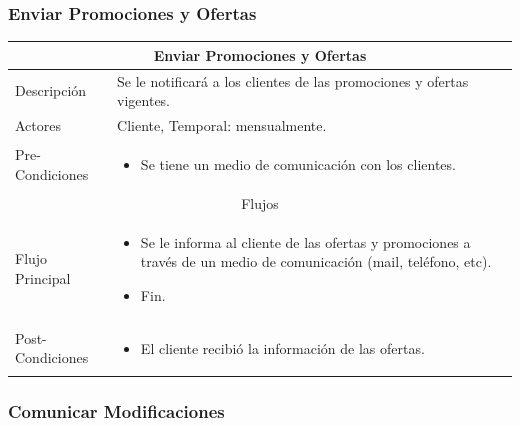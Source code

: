 \documentclass[12pt,a4paper]{article}
\newenvironment{myitemize}
{\begin{itemize}[leftmargin=*,noitemsep,topsep=0pt]}{\end{itemize}}
\newenvironment{caseuse}
{\begin{center}\begin{tabular}{|l|p{10cm}|}}{\end{tabular}\end{center}}
\begin{document}
		\subsubsection{Enviar Promociones y Ofertas}

			\begin{caseuse}
				\hline
				\multicolumn{2}{|c|}{Enviar Promociones y Ofertas} \\ \hline

				Descripción & Se le notificará a los clientes de las promociones y ofertas vigentes. \\ \hline

				Actores & Cliente, Temporal: mensualmente. \\ \hline

				Pre-Condiciones & 
					\begin{myitemize}
						\item Se tiene un medio de comunicación con los clientes.
					\end{myitemize} \\ \hline

				\multicolumn{2}{|c|}{Flujos} \\ \hline

				Flujo Principal &
					\begin{myitemize}
						\item Se le informa al cliente de las ofertas y promociones a través de un medio de comunicación (mail, teléfono, etc).
						\item Fin.
					\end{myitemize} \\ \hline

				Post-Condiciones &
					\begin{myitemize}
						\item El cliente recibió la información de las ofertas.
					\end{myitemize}\\ \hline
			\end{caseuse}

		\subsubsection{Comunicar Modificaciones}
\end{document}
